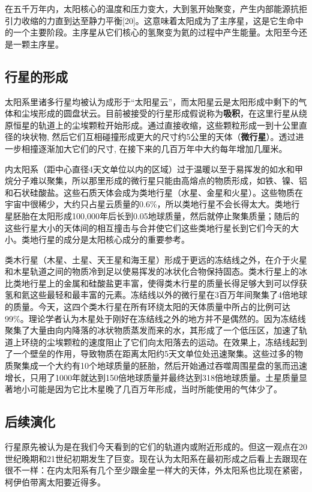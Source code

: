 \documentclass[hidelinks]{article}
\begin{document}
在五千万年内，太阳核心的温度和压力变大，大到氢开始聚变，产生内部能源抗拒引力收缩的力直到达至静力平衡[20]。这意味着太阳成为了主序星，这是它生命中的一个主要阶段。主序星从它们核心的氢聚变为氦的过程中产生能量。太阳至今还是一颗主序星。

\subsection{行星的形成}
太阳系里诸多行星均被认为成形于“太阳星云”，而太阳星云是太阳形成中剩下的气体和尘埃形成的圆盘状云。目前被接受的行星形成假说称为\textbf{吸积}，在这里行星从绕原恒星的轨道上的尘埃颗粒开始形成。通过直接收缩，这些颗粒形成一到十公里直径的块状物, 然后它们互相碰撞形成更大的尺寸约5公里的天体（\textbf{微行星}）。透过进一步相撞逐渐加大它们的尺寸, 在接下来的几百万年中大约每年增加几厘米。

内太阳系（距中心直径4天文单位以内的区域）过于温暖以至于易挥发的如水和甲烷分子难以聚集，所以那里形成的微行星只能由高熔点的物质形成，如铁、镍、铝和石状硅酸盐。这些石质天体会成为类地行星（水星、金星和火星）。这些物质在宇宙中很稀少，大约只占星云质量的0.6\%，所以类地行星不会长得太大。类地行星胚胎在太阳形成100,000年后长到0.05地球质量，然后就停止聚集质量；随后的这些行星大小的天体间的相互撞击与合并使它们这些类地行星长到它们今天的大小。类地行星的成分是太阳核心成分的重要参考。

类木行星（木星、土星、天王星和海王星）形成于更远的冻结线之外，在介于火星和木星轨道之间的物质冷到足以使易挥发的冰状化合物保持固态。类木行星上的冰比类地行星上的金属和硅酸盐更丰富，使得类木行星的质量长得足够大到可以俘获氢和氦这些最轻和最丰富的元素。冻结线以外的微行星在3百万年间聚集了4倍地球的质量。今天，这四个类木行星在所有环绕太阳的天体质量中所占的比例可达99\%。理论学者认为木星处于刚好在冻结线之外的地方并不是偶然的。因为冻结线聚集了大量由向内降落的冰状物质蒸发而来的水，其形成了一个低压区，加速了轨道上环绕的尘埃颗粒的速度阻止了它们向太阳落去的运动。在效果上，冻结线起到了一个壁垒的作用，导致物质在距离太阳约5天文单位处迅速聚集。这些过多的物质聚集成一个大约有10个地球质量的胚胎，然后开始通过吞噬周围星盘的氢而迅速增长，只用了1000年就达到150倍地球质量并最终达到318倍地球质量。土星质量显著地小可能是因为它比木星晚了几百万年形成，当时所能使用的气体少了。

\subsection{后续演化}
行星原先被认为是在我们今天看到的它们的轨道内或附近形成的。但这一观点在20世纪晚期和21世纪初期发生了巨变。现在认为太阳系在最初形成之后看上去跟现在很不一样：在内太阳系有几个至少跟金星一样大的天体，外太阳系也比现在紧密，柯伊伯带离太阳要近得多。
\end{document}
